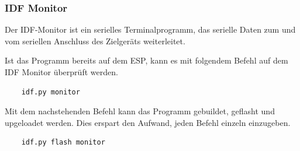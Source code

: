 \subsubsection{IDF Monitor}\label{sec:monitor}
Der IDF-Monitor ist ein serielles Terminalprogramm, das serielle Daten zum und vom seriellen Anschluss des Zielgeräts weiterleitet.

Ist das Programm bereits auf dem ESP, kann es mit folgendem Befehl auf dem IDF Monitor überprüft werden.

\begin{verbatim}
    idf.py monitor
\end{verbatim}

Mit dem nachstehenden Befehl kann das Programm gebuildet, geflasht und upgeloadet werden. Dies erspart den Aufwand, jeden Befehl einzeln einzugeben.

\begin{verbatim}
    idf.py flash monitor
\end{verbatim}







